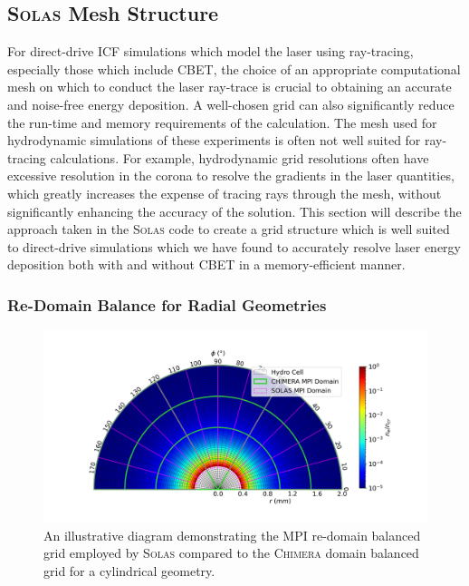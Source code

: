 \subsection{\textsc{Solas} Mesh Structure}%
\label{sec:SOLAS_mesh}

For direct-drive \ac{ICF} simulations which model the laser using ray-tracing, especially those which include \ac{CBET}, the choice of an appropriate computational mesh on which to conduct the laser ray-trace is crucial to obtaining an accurate and noise-free energy deposition.
A well-chosen grid can also significantly reduce the run-time and memory requirements of the calculation.
The mesh used for hydrodynamic simulations of these experiments is often not well suited for ray-tracing calculations.
For example, hydrodynamic grid resolutions often have excessive resolution in the corona to resolve the gradients in the laser quantities, which greatly increases the expense of tracing rays through the mesh, without significantly enhancing the accuracy of the solution.
This section will describe the approach taken in the \textsc{Solas} code to create a grid structure which is well suited to direct-drive simulations which we have found to accurately resolve laser energy deposition both with and without \ac{CBET} in a memory-efficient manner.

\subsubsection{Re-Domain Balance for Radial Geometries}

\begin{figure}[t!]
    \includegraphics[width=\linewidth]{Numerics/Images/SOLAS_CHIMERA_domain.png}
    \centering
    \caption{An illustrative diagram demonstrating the MPI re-domain balanced grid employed by \textsc{Solas} compared to the \textsc{Chimera} domain balanced grid for a cylindrical geometry.}%
    \label{fig:SOLAS_CHIMERA_domain}
\end{figure}

